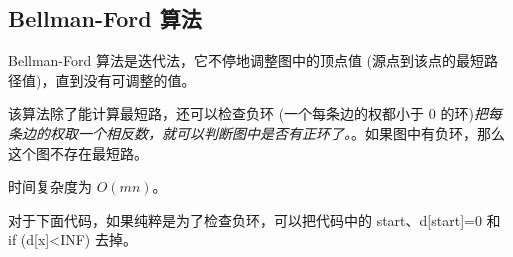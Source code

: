 \subsection{Bellman-Ford 算法}
	Bellman-Ford 算法是迭代法，它不停地调整图中的顶点值 (源点到该点的最短路径值)，直到没有可调整的值。

	该算法除了能计算最短路，还可以检查负环 (一个每条边的权都小于 0 的环)\emph{把每条边的权取一个相反数，就可以判断图中是否有正环了。}。如果图中有负环，那么这个图不存在最短路。

	时间复杂度为 $O(mn)$。

	对于下面代码，如果纯粹是为了检查负环，可以把代码中的 start、d[start]=0 和 if (d[x]<INF) 去掉。
	
	